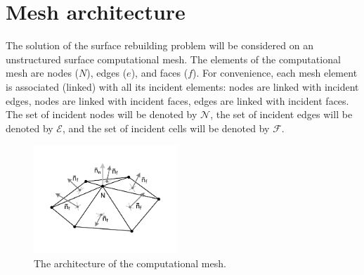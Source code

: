 \documentclass[
11pt,%
tightenlines,%
twoside,%
onecolumn,%
nofloats,%
nobibnotes,%
nofootinbib,%
superscriptaddress,%
noshowpacs,%
centertags]%
{revtex4}
\begin{document}

\section{Mesh architecture}

The solution of the surface rebuilding problem will be considered on an unstructured surface computational mesh.
The elements of the computational mesh are nodes ($N$), edges ($e$), and faces ($f$).
For convenience, each mesh element is associated (linked) with all its incident elements: nodes are linked with incident edges, nodes are linked with incident faces, edges are linked with incident faces.
The set of incident nodes will be denoted by $\mathscr{N}$, the set of incident edges will be denoted by $\mathscr{E}$, and the set of incident cells will be denoted by $\mathscr{F}$.

\begin{figure}[h]
\includegraphics[width=0.48\textwidth]{pics/pic_architecture_size.pdf}
\caption{The architecture of the computational mesh.}\label{fig:pic_architecture}
\end{figure}
\end{document}
